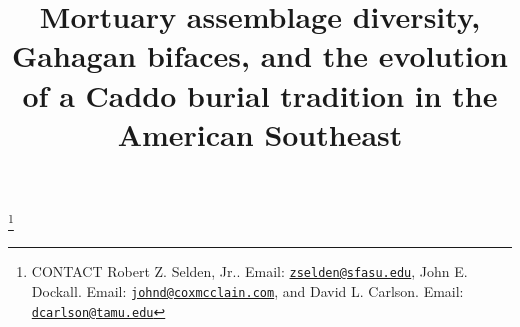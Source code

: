 \documentclass[]{interact}
\theoremstyle{plain}%
\theoremstyle{definition}
\theoremstyle{remark}
\begin{document}

\title{Mortuary assemblage diversity, Gahagan bifaces, and the evolution
of a Caddo burial tradition in the American Southeast}


\author{
}

\thanks{CONTACT Robert Z. Selden,
Jr.. Email: \href{mailto:zselden@sfasu.edu}{\nolinkurl{zselden@sfasu.edu}}, John
E.
Dockall. Email: \href{mailto:johnd@coxmcclain.com}{\nolinkurl{johnd@coxmcclain.com}}, and
David L.
Carlson. Email: \href{mailto:dcarlson@tamu.edu}{\nolinkurl{dcarlson@tamu.edu}}}

\maketitle
\end{document}
